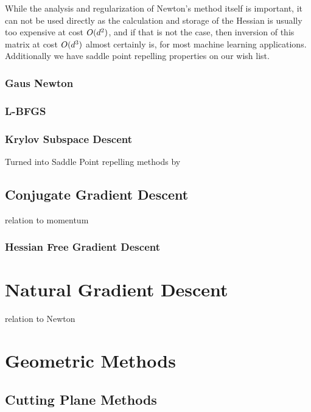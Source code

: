 While the analysis and regularization of Newton's method itself is important,
it can not be used directly as the calculation and storage of the Hessian is
usually too expensive at cost \(O(d^2)\), and if that is not the case,
then inversion of this matrix at cost \(O(d^3)\) almost certainly is,
for most machine learning applications. Additionally we have saddle point
repelling properties on our wish list.

\subsubsection{Gaus Newton}
\textcite{bottouOptimizationMethodsLargeScale2018}

\subsubsection{L-BFGS}

\subsubsection{Krylov Subspace Descent}

\textcite{vinyalsKrylovSubspaceDescent2012}

Turned into Saddle Point repelling methods by \textcite{dauphinIdentifyingAttackingSaddle2014}

\subsection{Conjugate Gradient Descent}

relation to momentum

\subsubsection{Hessian Free Gradient Descent}
\textcite{martensDeepLearningHessianfree2010}

\section{Natural Gradient Descent}

relation to Newton


\section{Geometric Methods}

\subsection{Cutting Plane Methods}

